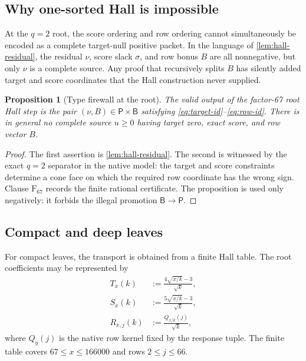 \documentclass[11pt]{article}
\newtheorem{proposition}[theorem]{Proposition}
\theoremstyle{definition}
\theoremstyle{remark}
\newcommand{\1}{\mathbf 1}
\newcommand{\Src}{\mathsf P}
\newcommand{\Bonus}{\mathsf B}
\begin{document}
\subsection{Why one-sorted Hall is impossible}

At the \(q=2\) root, the score ordering and row ordering cannot simultaneously be encoded as a complete target-null positive packet.  In the language of \cref{lem:hall-residual}, the residual \(\nu\), score slack \(\sigma\), and row bonus \(B\) are all nonnegative, but only \(\nu\) is a complete source.  Any proof that recursively splits \(B\) has silently added target and score coordinates that the Hall construction never supplied.

\begin{proposition}[Type firewall at the root]\label{prop:q2-firewall}
The valid output of the factor-67 root Hall step is the pair \((\nu,B)\in\Src\times\Bonus\) satisfying \eqref{eq:target-id}--\eqref{eq:row-id}.  There is in general no complete source \(u\ge0\) having target zero, exact score, and row vector \(B\).
\end{proposition}

\begin{proof}
The first assertion is \cref{lem:hall-residual}.  The second is witnessed by the exact \(q=2\) separator in the native model: the target and score constraints determine a cone face on which the required row coordinate has the wrong sign.  Clause \(\mathrm F_{67}\) records the finite rational certificate.  The proposition is used only negatively: it forbids the illegal promotion \(\Bonus\to\Src\).
\end{proof}

\subsection{Compact and deep leaves}

For compact leaves, the transport is obtained from a finite Hall table.  The root coefficients may be represented by
\begin{align}
T_x(k)&:=\frac{4\sqrt{x/k}-3}{\sqrt k},\label{eq:Tx}\\
S_x(k)&:=\frac{5\sqrt{x/k}-3}{\sqrt k},\label{eq:Sx}\\
R_{x,j}(k)&:=\frac{Q_{x/k}(j)}{\sqrt k},\label{eq:Rxj}
\end{align}
where \(Q_y(j)\) is the native row kernel fixed by the response tuple.  The finite table covers \(67\le x\le166000\) and rows \(2\le j\le66\).
\end{document}

